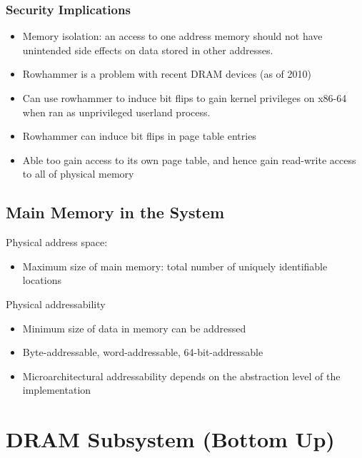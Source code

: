 \documentclass[]{article}
\providecommand{\tightlist}{%
  \setlength{\itemsep}{0pt}\setlength{\parskip}{0pt}}
\begin{document}
\hypertarget{security-implications}{%
\subsubsection{Security Implications}\label{security-implications}}

\begin{itemize}
\tightlist
\item
  Memory isolation: an access to one address memory should not have
  unintended side effects on data stored in other addresses.
\item
  Rowhammer is a problem with recent DRAM devices (as of 2010)
\item
  Can use rowhammer to induce bit flips to gain kernel privileges on
  x86-64 when ran as unprivileged userland process.
\item
  Rowhammer can induce bit flips in page table entries
\item
  Able too gain access to its own page table, and hence gain read-write
  access to all of physical memory
\end{itemize}

\hypertarget{main-memory-in-the-system}{%
\subsection{Main Memory in the System}\label{main-memory-in-the-system}}

Physical address space:

\begin{itemize}
\tightlist
\item
  Maximum size of main memory: total number of uniquely identifiable
  locations
\end{itemize}

Physical addressability

\begin{itemize}
\tightlist
\item
  Minimum size of data in memory can be addressed
\item
  Byte-addressable, word-addressable, 64-bit-addressable
\item
  Microarchitectural addressability depends on the abstraction level of
  the implementation
\end{itemize}

\newpage

\hypertarget{dram-subsystem-bottom-up}{%
\section{DRAM Subsystem (Bottom Up)}\label{dram-subsystem-bottom-up}}
\end{document}

